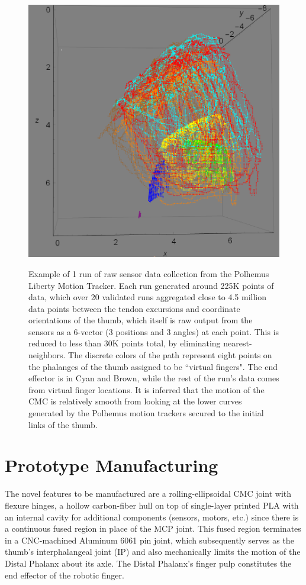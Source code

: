 \documentclass[letterpaper, 10 pt, conference]{ieeeconf}
\begin{document}
\vspace{-6pt}


\begin{figure}
	\centering
	\vspace{7pt}
	\includegraphics[width = .7\columnwidth]{Figures/H.PNG}\\
	\caption{Example of 1 run of raw sensor data collection from the Polhemus Liberty Motion Tracker. Each run generated around 225K points of data, which over 20 validated runs aggregated close to 4.5 million data points between the tendon excursions and coordinate orientations of the thumb, which itself is raw output from the sensors as a 6-vector (3 positions and 3 angles) at each point. This is reduced to less than 30K points total, by eliminating nearest-neighbors. The discrete colors of the path represent eight points on the phalanges of the thumb assigned to be ``virtual fingers". The end effector is in Cyan and Brown, while the rest of the run's data comes from virtual finger locations. It is inferred that the motion of the CMC is relatively smooth from looking at the lower curves generated by the Polhemus motion trackers secured to the initial links of the thumb.}\label{thumbphoto}
	\vspace{-15pt}

\end{figure}


\section{Prototype Manufacturing}
The novel features to be manufactured are a rolling-ellipsoidal CMC joint with flexure hinges, a hollow carbon-fiber hull on top of single-layer printed PLA with an internal cavity for additional components (sensors, motors, etc.) since there is a continuous fused region in place of the MCP joint. This fused region terminates in a CNC-machined Aluminum 6061 pin joint, which subsequently serves as the thumb's interphalangeal joint (IP) and also mechanically limits the motion of the Distal Phalanx about its axle. The Distal Phalanx's finger pulp constitutes the end effector of the robotic finger.
 
\end{document}
